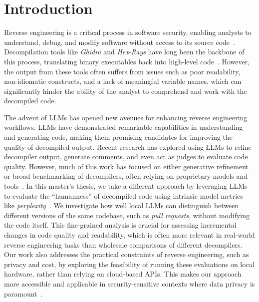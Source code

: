 \chapter{Introduction}\label{ch:introduction}

Reverse engineering is a critical process in software security, enabling analysts to understand, debug, and modify software without access to its source code~\cite{Paper:chikofsky1990reverse}.
Decompilation tools like \emph{Ghidra} and \emph{Hex-Rays} have long been the backbone of this process, translating binary executables back into high-level code~\cite{Paper:eagle2011idapro, site:ghidra2019}.
However, the output from these tools often suffers from issues such as poor readability, non-idiomatic constructs, and a lack of meaningful variable names, 
which can significantly hinder the ability of the analyst to comprehend and work with the decompiled code.
 
The advent of \acp{LLM} has opened new avenues for enhancing reverse engineering workflows. \acp{LLM} have demonstrated remarkable capabilities in understanding and generating code, making them promising candidates for improving 
the quality of decompiled output. Recent research has explored using \acp{LLM} to refine decompiler output, generate comments, and even act as judges 
to evaluate code quality. However, much of this work has focused on either generative refinement or broad benchmarking of decompilers, 
often relying on proprietary models and tools~\cite{Paper:Tan_2024, Paper:Hu2024DeGPTOD}.
In this master's thesis, we take a different approach by leveraging \acp{LLM} to evaluate the ``humanness'' of decompiled code using intrinsic model 
metrics like \emph{perplexity}~\cite{Paper:hindle2012naturalness}. We investigate how well local \acp{LLM} can distinguish between different versions of the same codebase, 
such as \emph{pull requests}, without modifying the code itself. This fine-grained analysis is crucial for assessing incremental changes in code 
quality and readability, which is often more relevant in real-world reverse engineering tasks than wholesale comparisons of different decompilers.
Our work also addresses the practical constraints of reverse engineering, such as privacy and cost, by exploring the feasibility of running these 
evaluations on local hardware, rather than relying on cloud-based \acp{API}. This makes our approach more accessible and applicable in security-sensitive contexts 
where data privacy is paramount~\cite{Paper:staab2024beyond, Paper:carlini2021extracting}.

